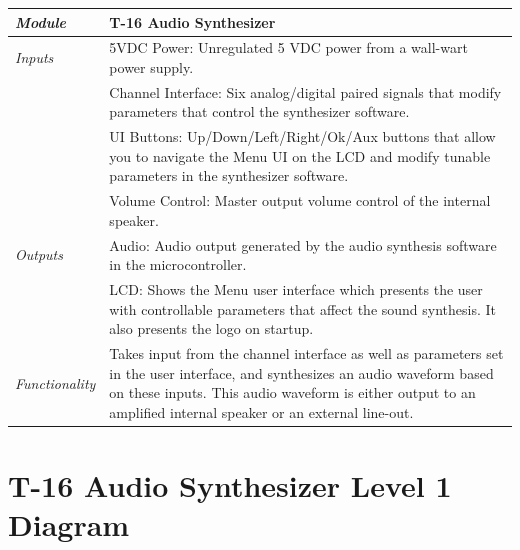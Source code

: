 \documentclass{article}
\begin{document}
\begin{tabular}{|p{1in}|p{5in}|}
\hline
\emph{Module} & T-16 Audio Synthesizer \\
\hline
\emph{Inputs}& 5VDC Power: Unregulated 5 VDC power from a wall-wart power supply.\\
	     & Channel Interface: Six analog/digital paired signals that modify parameters that control the synthesizer software. \\
      	     & UI Buttons: Up/Down/Left/Right/Ok/Aux buttons that allow you to navigate the Menu UI on the LCD and modify tunable parameters in the synthesizer software.\\
	     & Volume Control: Master output volume control of the internal speaker.\\
\hline
\emph{Outputs}& Audio: Audio output generated by the audio synthesis software in the microcontroller.\\ 
	      & LCD: Shows the Menu user interface which presents the user with controllable parameters that affect the sound synthesis. It also presents the logo on startup. \\
\hline
\emph{Functionality}& Takes input from the channel interface as well as parameters set in the user interface, and synthesizes an audio waveform based on these inputs. This audio waveform is either output to an amplified internal speaker or an external line-out.\\
\hline
\end{tabular}

\section{T-16 Audio Synthesizer Level 1 Diagram}
\end{document}
